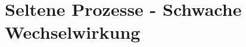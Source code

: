 \documentclass[aspectratio=1610, captions=tableheading, 11pt]{beamer}
\begin{document}
%
%


\section{Seltene Prozesse - Schwache Wechselwirkung}
\end{document}

